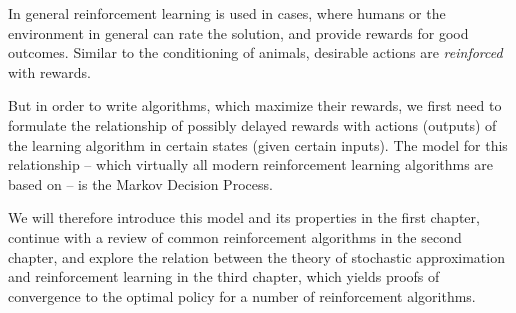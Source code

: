     In general reinforcement learning is used in cases, where humans or the environment in general can rate the solution, and provide rewards for good outcomes. Similar to the conditioning of animals, desirable actions are \emph{reinforced} with rewards. 

    But in order to write algorithms, which maximize their rewards, we first need to formulate the relationship of possibly delayed rewards with actions (outputs) of the learning algorithm in certain states (given certain inputs). The model for this relationship -- which virtually all modern reinforcement learning algorithms are based on -- is the Markov Decision Process. 
    
    We will therefore introduce this model and its properties in the first chapter, continue with a review of common reinforcement algorithms in the second chapter, and explore the relation between the theory of stochastic approximation and reinforcement learning in the third chapter, which yields proofs of convergence to the optimal policy for a number of reinforcement algorithms. 
\endinput
